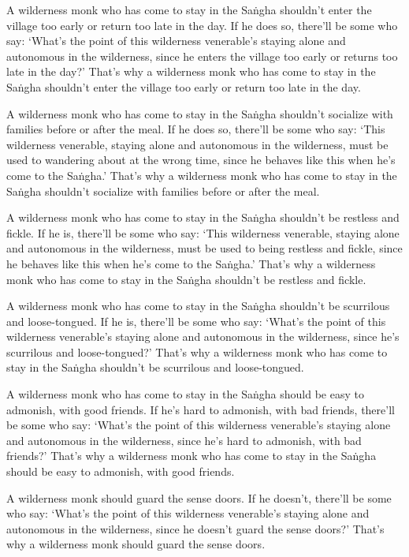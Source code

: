 \documentclass[12pt,openany]{book}%
\begin{document}
A wilderness monk who has come to stay in the \textsanskrit{Saṅgha} shouldn’t enter the village too early or return too late in the day. If he does so, there’ll be some who say: ‘What’s the point of this wilderness venerable’s staying alone and autonomous in the wilderness, since he enters the village too early or returns too late in the day?’ That’s why a wilderness monk who has come to stay in the \textsanskrit{Saṅgha} shouldn’t enter the village too early or return too late in the day. 

A wilderness monk who has come to stay in the \textsanskrit{Saṅgha} shouldn’t socialize with families before or after the meal. If he does so, there’ll be some who say: ‘This wilderness venerable, staying alone and autonomous in the wilderness, must be used to wandering about at the wrong time, since he behaves like this when he’s come to the \textsanskrit{Saṅgha}.’ That’s why a wilderness monk who has come to stay in the \textsanskrit{Saṅgha} shouldn’t socialize with families before or after the meal. 

A wilderness monk who has come to stay in the \textsanskrit{Saṅgha} shouldn’t be restless and fickle. If he is, there’ll be some who say: ‘This wilderness venerable, staying alone and autonomous in the wilderness, must be used to being restless and fickle, since he behaves like this when he’s come to the \textsanskrit{Saṅgha}.’ That’s why a wilderness monk who has come to stay in the \textsanskrit{Saṅgha} shouldn’t be restless and fickle. 

A wilderness monk who has come to stay in the \textsanskrit{Saṅgha} shouldn’t be scurrilous and loose-tongued. If he is, there’ll be some who say: ‘What’s the point of this wilderness venerable’s staying alone and autonomous in the wilderness, since he’s scurrilous and loose-tongued?’ That’s why a wilderness monk who has come to stay in the \textsanskrit{Saṅgha} shouldn’t be scurrilous and loose-tongued. 

A wilderness monk who has come to stay in the \textsanskrit{Saṅgha} should be easy to admonish, with good friends. If he’s hard to admonish, with bad friends, there’ll be some who say: ‘What’s the point of this wilderness venerable’s staying alone and autonomous in the wilderness, since he’s hard to admonish, with bad friends?’ That’s why a wilderness monk who has come to stay in the \textsanskrit{Saṅgha} should be easy to admonish, with good friends. 

A wilderness monk should guard the sense doors. If he doesn’t, there’ll be some who say: ‘What’s the point of this wilderness venerable’s staying alone and autonomous in the wilderness, since he doesn’t guard the sense doors?’ That’s why a wilderness monk should guard the sense doors. 
\end{document}
